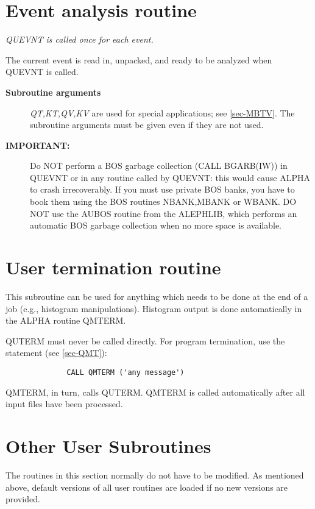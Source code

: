 \section{\label{sec-UE}Event analysis routine}
\par
{}
\par {\it QUEVNT is called once for each event.}

The current event is
read in, unpacked, and ready to be analyzed when QUEVNT is called.
\begin{description}\item[\bf{Subroutine arguments
}]{\it QT,KT,QV,KV}
are used for special applications;
see \ref{sec-MBTV}. The subroutine arguments must
be given even if they are not used.
\end{description}
\begin{description}\item[\bf{IMPORTANT:
}]Do NOT perform a BOS garbage collection (CALL BGARB(IW)) in QUEVNT or in
any routine called by QUEVNT: this would cause ALPHA to crash irrecoverably.
If you must use private BOS banks, you have to book them using the BOS routines NBANK,MBANK or WBANK.
DO NOT use the AUBOS routine from the ALEPHLIB, which performs an automatic BOS garbage collection
when no more space is available.
\end{description}
\section{\label{sec-UT}User termination routine}
\par
{}
\par This subroutine can be used for anything which needs to
be done at the end of a job (e.g., histogram manipulations).
Histogram output is done automatically in the ALPHA routine QMTERM.
 
QUTERM must never be called directly. For program termination, use
the
statement
(see \ref{sec-QMT}):
\begin{verbatim}
              CALL QMTERM ('any message')
\end{verbatim}
QMTERM, in turn, calls QUTERM.
QMTERM is called automatically after all input files have
been processed.
\section{\label{sec-OUS}Other User Subroutines}
\par
The routines in this section normally do not have to be modified.
As mentioned above, default versions of all user routines are loaded
if
no new versions are provided.
\par
